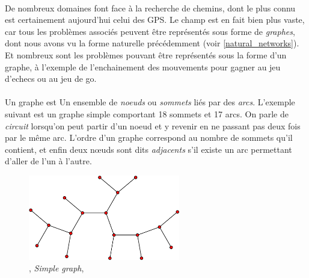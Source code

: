 \paragraph{} De nombreux domaines font face à la recherche de chemins, dont le plus connu est certainement aujourd'hui
celui des GPS. Le champ est en fait bien plus vaste, car tous les problèmes associés peuvent être représentés sous
forme de \emph{graphes}, dont nous avons vu la forme naturelle précédemment (voir \ref{natural_networks}). Et nombreux
sont les problèmes pouvant être représentés sous la forme d'un graphe, à l'exemple de l'enchainement des mouvements pour
gagner au jeu d'echecs ou au jeu de go.

\paragraph{} Un graphe est \guillemotleft Un ensemble de \emph{noeuds} ou \emph{sommets} liés par des \emph{arcs}\guillemotright.
\cite{AI1} L'exemple suivant est un graphe simple comportant 18 sommets et 17 arcs. On parle de \emph{circuit} lorsqu'on
peut partir d'un noeud et y revenir en ne passant pas deux fois par le même arc. L'ordre d'un graphe correspond au nombre
de sommets qu'il contient, et enfin deux n\oe{}uds sont dits \emph{adjacents} s'il existe un arc permettant d'aller de
l'un à l'autre.

\begin{figure}[h]
    \centering
    \includegraphics[width=250px]{chapters/03/images/simple_graph.png}
    \caption{\label{graph}, \emph{Simple graph}, \cite{GraphTheory0}}
\end{figure}

